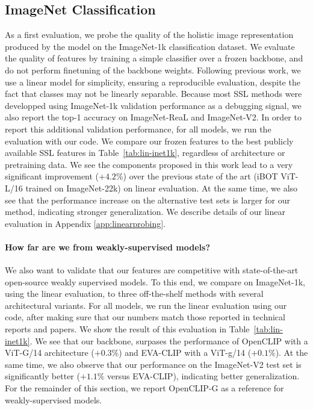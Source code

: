 \subsection{ImageNet Classification}
\label{sec:imagenet}
As a first evaluation, we probe the quality of the holistic image representation produced by the model on the ImageNet-1k classification dataset. We evaluate the quality of features by training a simple classifier over a frozen backbone, and do not perform finetuning of the backbone weights. Following previous work, we use a linear model for simplicity, ensuring a reproducible evaluation, despite the fact that classes may not be linearly separable. Because most SSL methods were developped using ImageNet-1k validation performance as a debugging signal, we also report the top-1 accuracy on ImageNet-ReaL and ImageNet-V2. In order to report this additional validation performance, for all models, we run the evaluation with our code. We compare our frozen features to the best publicly available SSL features in Table~\ref{tab:lin-inet1k}, regardless of architecture or pretraining data. We see the components proposed in this work lead to a very significant improvement ($+4.2\%$) over the previous state of the art (iBOT ViT-L/16 trained on ImageNet-22k) on linear evaluation. At the same time, we also see that the performance increase on the alternative test sets is larger for our method, indicating stronger generalization. We describe details of our linear evaluation in Appendix \ref{app:linearprobing}.

\paragraph{How far are we from weakly-supervised models?} We also want to validate that our features are competitive with state-of-the-art open-source weakly supervised models. To this end, we compare on ImageNet-1k, using the linear evaluation, to three off-the-shelf methods with several architectural variants. For all models, we run the linear evaluation using our code, after making sure that our numbers match those reported in technical reports and papers. We show the result of this evaluation in Table~\ref{tab:lin-inet1k}.
We see that our backbone, surpases the performance of OpenCLIP with a ViT-G/14 architecture ($+0.3\%$) and EVA-CLIP with a ViT-g/14 ($+0.1\%$).
At the same time, we also observe that our performance on the ImageNet-V2 test set is significantly better ($+1.1\%$ versus EVA-CLIP), indicating better generalization. For the remainder of this section, we report OpenCLIP-G as a reference for weakly-supervised models.


